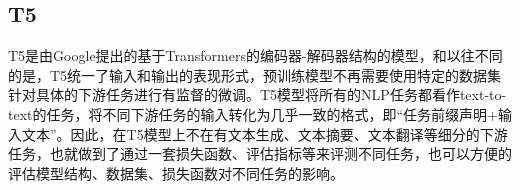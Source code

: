 \documentclass[
    decl-page,  %
    ,fontset = win, %
  ]{njuthesis}
\begin{document}




\subsection{T5}
T5是由Google提出的基于Transformers的编码器-解码器结构的模型\cite{raffel2020exploring}，和以往不同的是，T5统一了输入和输出的表现形式，预训练模型不再需要使用特定的数据集针对具体的下游任务进行有监督的微调。T5模型将所有的NLP任务都看作text-to-text的任务，将不同下游任务的输入转化为几乎一致的格式，即“任务前缀声明+输入文本”。因此，在T5模型上不在有文本生成、文本摘要、文本翻译等细分的下游任务，也就做到了通过一套损失函数、评估指标等来评测不同任务，也可以方便的评估模型结构、数据集、损失函数对不同任务的影响。

\end{document}
